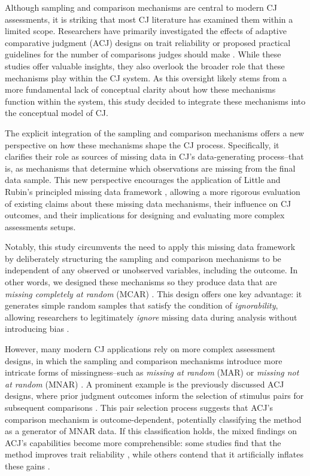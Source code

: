 \documentclass[
  authoryear,
  review,
  1p]{elsarticle}
\begin{document}
Although sampling and comparison mechanisms are central to modern CJ
assessments, it is striking that most CJ literature has examined them
within a limited scope. Researchers have primarily investigated the
effects of adaptive comparative judgment (ACJ) designs on trait
reliability
\citep{Pollitt_2012a, Pollitt_2012b, Bramley_2015, Verhavert_et_al_2022, Mikhailiuk_et_al_2021, Gray_et_al_2024}
or proposed practical guidelines for the number of comparisons judges
should make \citep{Verhavert_et_al_2019, Crompvoets_et_al_2022}. While
these studies offer valuable insights, they also overlook the broader
role that these mechanisms play within the CJ system. As this oversight
likely stems from a more fundamental lack of conceptual clarity about
how these mechanisms function within the system, this study decided to
integrate these mechanisms into the conceptual model of CJ.

The explicit integration of the sampling and comparison mechanisms
offers a new perspective on how these mechanisms shape the CJ process.
Specifically, it clarifies their role as sources of missing data in CJ's
data-generating process--that is, as mechanisms that determine which
observations are missing from the final data sample. This new
perspective encourages the application of Little and Rubin's principled
missing data framework \citeyearpar{Little_et_al_2020}, allowing a more
rigorous evaluation of existing claims about these missing data
mechanisms, their influence on CJ outcomes, and their implications for
designing and evaluating more complex assessments setups.

Notably, this study circumvents the need to apply this missing data
framework by deliberately structuring the sampling and comparison
mechanisms to be independent of any observed or unobserved variables,
including the outcome. In other words, we designed these mechanisms so
they produce data that are \emph{missing completely at random} (MCAR)
\citep{Little_et_al_2020}. This design offers one key advantage: it
generates simple random samples that satisfy the condition of
\emph{ignorability}, allowing researchers to legitimately \emph{ignore}
missing data during analysis without introducing bias
\citep{Everitt_et_al_2010, Kohler_et_al_2019, Neal_2020}.

However, many modern CJ applications rely on more complex assessment
designs, in which the sampling and comparison mechanisms introduce more
intricate forms of missingness--such as \emph{missing at random} (MAR)
or \emph{missing not at random} (MNAR) \citep{Little_et_al_2020}. A
prominent example is the previously discussed ACJ designs, where prior
judgment outcomes inform the selection of stimulus pairs for subsequent
comparisons \citep{Pollitt_2012a, Pollitt_2012b, Bramley_2015}. This
pair selection process suggests that ACJ's comparison mechanism is
outcome-dependent, potentially classifying the method as a generator of
MNAR data. If this classification holds, the mixed findings on ACJ's
capabilities become more comprehensible: some studies find that the
method improves trait reliability
\citep{Pollitt_et_al_2003, Pollitt_2012a, Pollitt_2012b}, while others
contend that it artificially inflates these gains
\citep{Bramley_2015, Bramley_et_al_2019, Crompvoets_et_al_2020, Crompvoets_et_al_2022}.
\end{document}
